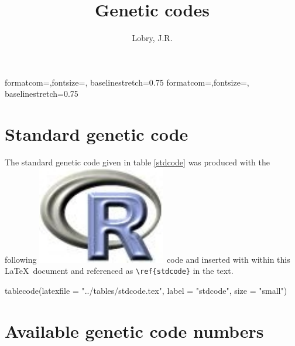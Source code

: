 \documentclass{article}
\title{Genetic codes}
\author{Lobry, J.R.}
\begin{document}
%
%
{formatcom={\color{Sinput}},fontsize=\footnotesize, baselinestretch=0.75}
{formatcom={\color{Soutput}},fontsize=\footnotesize, baselinestretch=0.75}
%
%
\newcommand{\Rlogo}{\protect\includegraphics[height=1.8ex,keepaspectratio]{../figs/Rlogo.pdf}}
%
%
\newcommand{\seqinr}{\texttt{seqin\bf{R}}}
\newcommand{\Seqinr}{\texttt{Seqin\bf{R}}}
%
%
%
%
%


\maketitle

\section{Standard genetic code}

The standard genetic code given in table \ref{stdcode} was produced with the
following \Rlogo{}~code and inserted with \verb||
within this \LaTeX~document and referenced as \verb|\ref{stdcode}| in
the text.

\begin{Schunk}
\begin{Sinput}
 tablecode(latexfile = "../tables/stdcode.tex", label = "stdcode", 
     size = "small")
\end{Sinput}
\end{Schunk}



\section{Available genetic code numbers}
\end{document}
